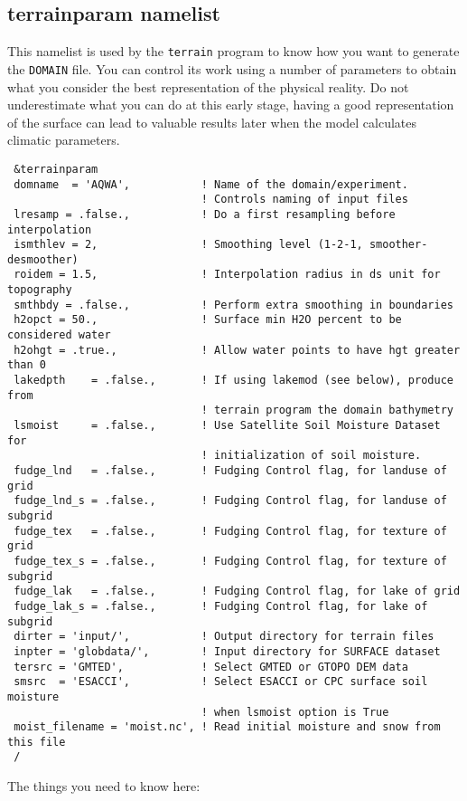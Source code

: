 \subsection{terrainparam namelist}
\label{terparam}
This namelist is used by the \verb=terrain= program to know how you want
to generate the \verb=DOMAIN= file. You can control its work using a number of
parameters to obtain what you consider the best representation of the
physical reality. Do not underestimate what you can do at this early stage,
having a good representation of the surface can lead to valuable results
later when the model calculates climatic parameters.

{\footnotesize
\begin{Verbatim}
 &terrainparam
 domname  = 'AQWA',           ! Name of the domain/experiment.
                              ! Controls naming of input files
 lresamp = .false.,           ! Do a first resampling before interpolation
 ismthlev = 2,                ! Smoothing level (1-2-1, smoother-desmoother)
 roidem = 1.5,                ! Interpolation radius in ds unit for topography
 smthbdy = .false.,           ! Perform extra smoothing in boundaries
 h2opct = 50.,                ! Surface min H2O percent to be considered water
 h2ohgt = .true.,             ! Allow water points to have hgt greater than 0
 lakedpth    = .false.,       ! If using lakemod (see below), produce from
                              ! terrain program the domain bathymetry
 lsmoist     = .false.,       ! Use Satellite Soil Moisture Dataset for
                              ! initialization of soil moisture.
 fudge_lnd   = .false.,       ! Fudging Control flag, for landuse of grid 
 fudge_lnd_s = .false.,       ! Fudging Control flag, for landuse of subgrid
 fudge_tex   = .false.,       ! Fudging Control flag, for texture of grid
 fudge_tex_s = .false.,       ! Fudging Control flag, for texture of subgrid
 fudge_lak   = .false.,       ! Fudging Control flag, for lake of grid
 fudge_lak_s = .false.,       ! Fudging Control flag, for lake of subgrid
 dirter = 'input/',           ! Output directory for terrain files
 inpter = 'globdata/',        ! Input directory for SURFACE dataset
 tersrc = 'GMTED',            ! Select GMTED or GTOPO DEM data
 smsrc  = 'ESACCI',           ! Select ESACCI or CPC surface soil moisture
                              ! when lsmoist option is True
 moist_filename = 'moist.nc', ! Read initial moisture and snow from this file
 /
\end{Verbatim}
}

The things you need to know here:


